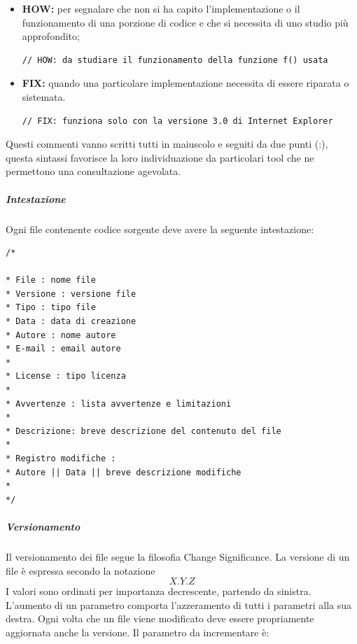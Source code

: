 \begin{itemize}
\begin{itemize}
				\item \textbf{HOW:} per segnalare che non si ha capito l'implementazione o il funzionamento di una porzione di codice e che si necessita di uno studio più approfondito;
				\begin{lstlisting}
// HOW: da studiare il funzionamento della funzione f() usata
				\end{lstlisting}
				
				\item \textbf{FIX:} quando una particolare implementazione necessita di essere riparata o sistemata.
				\begin{lstlisting}
// FIX: funziona solo con la versione 3.0 di Internet Explorer
				\end{lstlisting}
			\end{itemize}
			Questi commenti vanno scritti tutti in maiuscolo e seguiti da due punti (:), questa sintassi favorisce la loro individuazione da particolari tool che ne permettono una consultazione agevolata.
			
			\end{itemize}
			\subparagraph{Intestazione} \Spazio
			Ogni file contenente codice sorgente deve avere la seguente intestazione:
			\begin{lstlisting}
/*

* File : nome file
* Versione : versione file
* Tipo : tipo file
* Data : data di creazione
* Autore : nome autore 
* E-mail : email autore 
*
* License : tipo licenza				
*				
* Avvertenze : lista avvertenze e limitazioni
*
* Descrizione: breve descrizione del contenuto del file
*
* Registro modifiche :
* Autore || Data || breve descrizione modifiche
*
*/
			\end{lstlisting}
			\subparagraph{Versionamento} \Spazio
			Il versionamento dei file segue la filosofia Change Significance. La versione di un file è espressa secondo la notazione $$X.Y.Z$$ I valori sono ordinati per importanza decrescente, partendo da sinistra. L'aumento di un parametro comporta l'azzeramento di tutti i parametri alla sua destra. Ogni volta che un file viene modificato deve essere propriamente aggiornata anche la versione. Il parametro da incrementare è:
